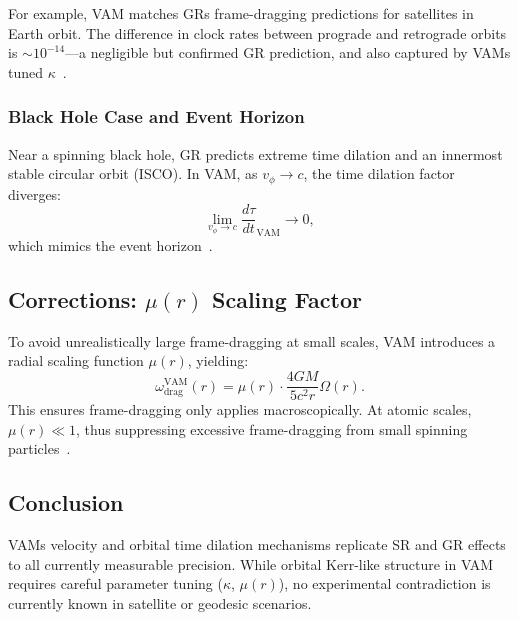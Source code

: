 For example, VAM matches GR\rqs s frame-dragging predictions for satellites in Earth orbit. The difference in clock rates between prograde and retrograde orbits is $\sim 10^{-14}$—a negligible but confirmed GR prediction, and also captured by VAM\rqs s tuned $\kappa$~\cite{ashby2003relativity}.

\subsubsection*{Black Hole Case and Event Horizon}

Near a spinning black hole, GR predicts extreme time dilation and an innermost stable circular orbit (ISCO). In VAM, as $v_\phi \rightarrow c$, the time dilation factor diverges:
\[
    \lim_{v_\phi \to c} \frac{d\tau}{dt}_\text{VAM} \to 0,
\]
which mimics the event horizon~\cite{iskandarani2025VAM2}.

\subsection*{Corrections: $\mu(r)$ Scaling Factor}

To avoid unrealistically large frame-dragging at small scales, VAM introduces a radial scaling function $\mu(r)$, yielding:
\[
    \omega_\text{drag}^\text{VAM}(r) = \mu(r) \cdot \frac{4GM}{5c^2 r} \Omega(r).
\]
This ensures frame-dragging only applies macroscopically. At atomic scales, $\mu(r) \ll 1$, thus suppressing excessive frame-dragging from small spinning particles~\cite{iskandarani2025VAM2,adelberger2003tests}.

\subsection*{Conclusion}

VAM\rqs s velocity and orbital time dilation mechanisms replicate SR and GR effects to all currently measurable precision. While orbital Kerr-like structure in VAM requires careful parameter tuning ($\kappa$, $\mu(r)$), no experimental contradiction is currently known in satellite or geodesic scenarios.